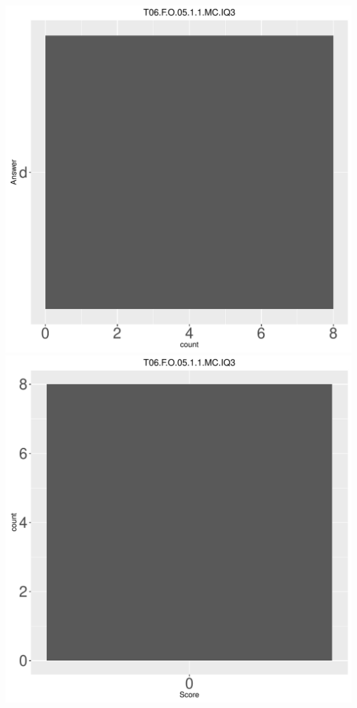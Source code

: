 \documentclass[12pt,english,nohyper]{tufte-handout}\usepackage[]{graphicx}\usepackage[]{color}
\begin{document}
\begin{center} \includegraphics[width=.45\linewidth]{Topic06_AB_57_answer} \includegraphics[width=.45\linewidth]{Topic06_AB_57_score} \end{center} 
\end{document}
